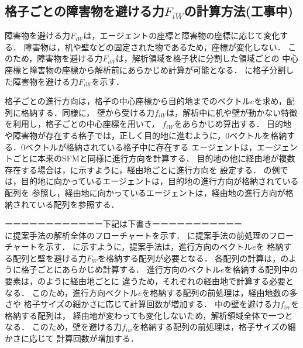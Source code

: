 \subsection{格子ごとの障害物を避ける力$F_{iW}$の計算方法(工事中)}
障害物を避ける力$F_{iW}$は，エージェントの座標と障害物の座標に応じて変化する．
障害物は，机や壁などの固定された物であるため，座標が変化しない．
このため，障害物を避ける力$F_{iW}$は，解析領域を格子状に分割した領域ごとの
中心座標と障害物の座標から解析前にあらかじめ計算が可能となる．
に格子分割した障害物を避ける力$F_{iW}$を示す．




格子ごとの進行方向は，格子の中心座標から目的地までのベクトル$e$を求め，配列に格納する．同様に，
壁から受ける力$f_{iW}$は，解析中に机や壁が動かない特徴を利用し，格子ごとの中心座標を用いて，
$f_{iW}$をあらかじめ算出する．
目的地や障害物が存在する格子では，正しく目的地に進むように，0ベクトルを格納する．0ベクトルが格納されている格子中に存在する
エージェントは，エージェントごとに本来のSFMと同様に進行方向を計算する．
目的地の他に経由地が複数存在する場合は，に示すように，経由地ごとに進行方向を
設定する．
の例では，目的地に向かっているエージェントは，目的地の進行方向が格納されている配列を
参照し，経由地に向かっているエージェントは，経由地の進行方向が格納されている配列を参照する．


ーーーーーーーーーーーー下記は下書きーーーーーーーーーーー\\
に提案手法の解析全体のフローチャートを示す．
に提案手法の前処理のフローチャートを示す．
に示すように，提案手法は，進行方向のベクトル$e$を
格納する配列と壁を避ける力$F_W$を格納する配列が必要となる．
各配列の計算は，のように格子ごとにあらかじめ計算する．
進行方向のベクトル$e$を格納する配列中の要素は，のように経由地ごとに
違うため，それぞれの経由地で計算する必要となる．
このため，進行方向ベクトル$e$を格納する配列の前処理は，経由地数の多さや
格子サイズの細かさに応じて計算回数が増加する．
中の壁を避ける力$f_{iw}$を格納する配列は，
経由地が変わっても変化しないため，解析領域全体で一つとなる．
このため，壁を避ける力$f_{iw}$を格納する配列の前処理は，格子サイズの細かさに応じて
計算回数が増加する．



